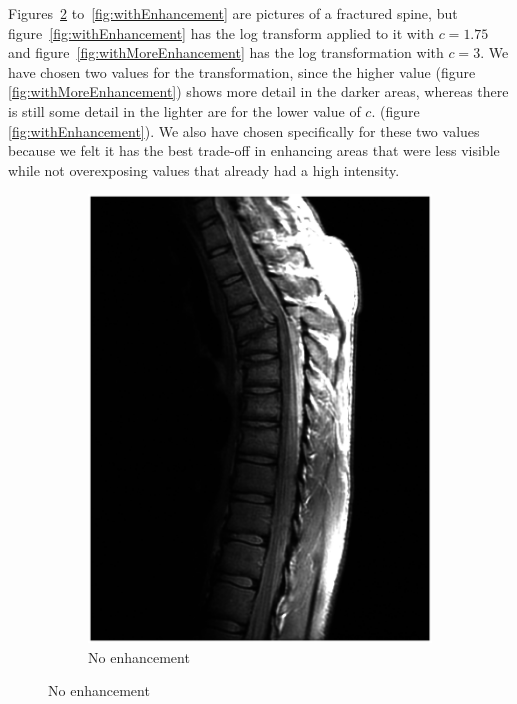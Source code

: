 Figures~\ref{fig:withoutEnhancement} to~\ref{fig:withEnhancement} are pictures of a fractured spine, but figure~\ref{fig:withEnhancement} has the log transform applied to it with $c = 1.75$ and figure~\ref{fig:withMoreEnhancement} has the log transformation with $c=3$. 
We have chosen two values for the transformation, since the higher value (figure \ref{fig:withMoreEnhancement}) shows more detail in the darker areas, whereas there is still some detail in the lighter are for the lower value of $c$. (figure \ref{fig:withEnhancement}). We also have chosen specifically for these two values because we felt it has the best trade-off in enhancing areas that were less visible while not overexposing values that already had a high intensity.
\begin{figure}[!Htb]
 \centering
 \begin{subfigure}[b]{0.32\linewidth}
  \includegraphics[width=\textwidth]{breukLelijk.eps} 
  \caption{No enhancement}
  \label{fig:withoutEnhancement} 
 \end{subfigure}

\end{figure}

